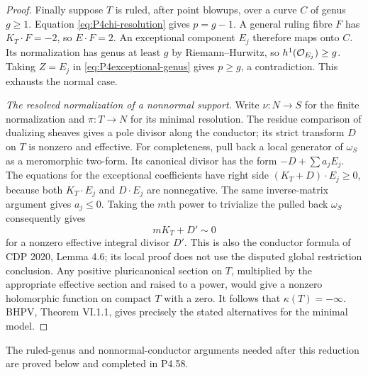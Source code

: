 \begin{proof}
Finally suppose $T$ is ruled, after point blowups, over a curve
$C$ of genus $g\ge1$. Equation \eqref{eq:P4chi-resolution}
gives $p=g-1$. A general ruling fibre $F$ has $K_T\cdot F=-2$,
so $E\cdot F=2$. An exceptional component $E_j$ therefore
maps onto $C$. Its normalization has genus at least $g$ by
Riemann--Hurwitz, so $h^1(\mathcal O_{E_j})\ge g$. Taking $Z=E_j$
in \eqref{eq:P4exceptional-genus} gives $p\ge g$, a contradiction.
This exhausts the normal case.

\emph{The resolved normalization of a nonnormal support.}
Write $\nu:N\to S$ for the finite normalization and $\pi:T\to N$
for its minimal resolution. The residue comparison of dualizing
sheaves gives a pole divisor along the conductor; its strict
transform $D$ on $T$ is nonzero and effective. For completeness,
pull back a local generator of $\omega_S$ as a meromorphic
two-form. Its canonical divisor has the form $-D+\sum a_jE_j$.
The equations for the exceptional coefficients have right side
$(K_T+D)\cdot E_j\ge0$, because both $K_T\cdot E_j$ and
$D\cdot E_j$ are nonnegative. The same inverse-matrix argument
gives $a_j\le0$. Taking the $m$th power to trivialize the pulled
back $\omega_S$ consequently gives
\[
 mK_T+D'\sim0
\]
for a nonzero effective integral divisor $D'$. This is also the
conductor formula of CDP 2020, Lemma 4.6; its local proof does
not use the disputed global restriction conclusion. Any
positive pluricanonical section on $T$, multiplied by the
appropriate effective section and raised to a power, would give
a nonzero holomorphic function on compact $T$ with a zero.
It follows that $\kappa(T)=-\infty$. BHPV, Theorem VI.1.1,
gives precisely the stated alternatives for the minimal model.
\end{proof}

The ruled-genus and nonnormal-conductor arguments needed after
this reduction are proved below and completed in P4.58.

